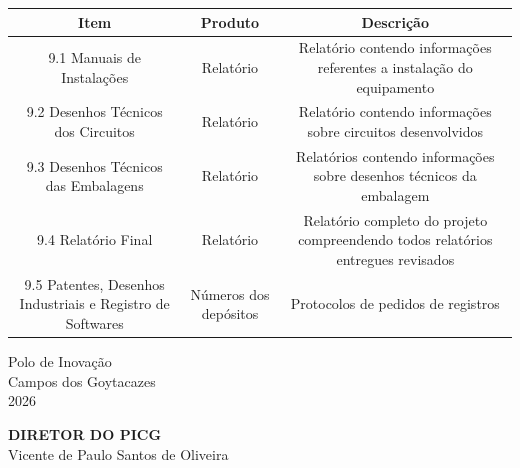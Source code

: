 \begin{center}
    \begin{center}
    \small
    \begin{tabular}{|c|c|c|}
    \hline
        Item & Produto & Descrição \\
    \hline
        \multicolumn{1}{|m{5cm}|}{
            9.1 Manuais de Instalações
        } 
        & \multicolumn{1}{m{3.5cm}|}{
            \centering
            Relatório
        } 
        & \multicolumn{1}{m{6.5cm}|}{
            Relatório contendo informações referentes a instalação do equipamento
        }\\
    \hline
        \multicolumn{1}{|m{5cm}|}{
            9.2 Desenhos Técnicos dos Circuitos
        } 
        & \multicolumn{1}{m{3.5cm}|}{
            \centering
            Relatório
        } 
        & \multicolumn{1}{m{6.5cm}|}{
            Relatório contendo
            informações sobre circuitos
            desenvolvidos
        }\\
    \hline
        \multicolumn{1}{|m{5cm}|}{
            9.3 Desenhos Técnicos das Embalagens
        } 
        & \multicolumn{1}{m{3.5cm}|}{
            \centering
            Relatório
        } 
        & \multicolumn{1}{m{6.5cm}|}{
            Relatórios contendo
            informações sobre desenhos
            técnicos da embalagem
        }\\
    \hline
        \multicolumn{1}{|m{5cm}|}{
            9.4 Relatório Final
        } 
        & \multicolumn{1}{m{3.5cm}|}{
            \centering
            Relatório
        } 
        & \multicolumn{1}{m{6.5cm}|}{
            Relatório completo do
            projeto compreendendo
            todos relatórios entregues
            revisados
        }\\
    \hline
        \multicolumn{1}{|m{5cm}|}{
            9.5 Patentes, Desenhos Industriais e Registro
            de Softwares
        } 
        & \multicolumn{1}{m{3.5cm}|}{
            \centering
            Números dos depósitos
        } 
        & \multicolumn{1}{m{6.5cm}|}{
            Protocolos de pedidos de registros
        }\\
    \hline
    \end{tabular}
\end{center}

    \vfill
    \centering
    Polo de Inovação\\
    Campos dos Goytacazes\\
    2026

    \newpage

    \vfill
    \textbf{DIRETOR DO PICG}\\
    Vicente de Paulo Santos de Oliveira
    \vfill
    

\end{center}
